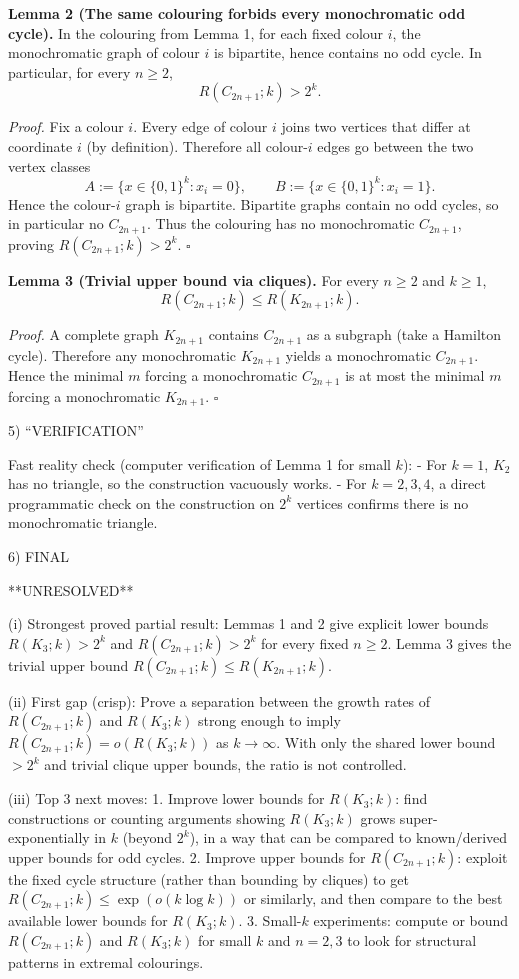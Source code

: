\textbf{Lemma 2 (The same colouring forbids every monochromatic odd cycle).}
In the colouring from Lemma 1, for each fixed colour $i$, the monochromatic graph of colour $i$ is bipartite, hence contains no odd cycle. In particular, for every $n\ge 2$,
\[
R(C_{2n+1};k) > 2^k.
\]

\emph{Proof.}
Fix a colour $i$. Every edge of colour $i$ joins two vertices that differ at coordinate $i$ (by definition). Therefore all colour-$i$ edges go between the two vertex classes
\[
A:=\{x\in\{0,1\}^k : x_i=0\},\qquad B:=\{x\in\{0,1\}^k : x_i=1\}.
\]
Hence the colour-$i$ graph is bipartite. Bipartite graphs contain no odd cycles, so in particular no $C_{2n+1}$.
Thus the colouring has no monochromatic $C_{2n+1}$, proving $R(C_{2n+1};k)>2^k$. $\square$

\textbf{Lemma 3 (Trivial upper bound via cliques).}
For every $n\ge 2$ and $k\ge 1$,
\[
R(C_{2n+1};k) \le R(K_{2n+1};k).
\]

\emph{Proof.}
A complete graph $K_{2n+1}$ contains $C_{2n+1}$ as a subgraph (take a Hamilton cycle). Therefore any monochromatic $K_{2n+1}$ yields a monochromatic $C_{2n+1}$. Hence the minimal $m$ forcing a monochromatic $C_{2n+1}$ is at most the minimal $m$ forcing a monochromatic $K_{2n+1}$. $\square$

5) “VERIFICATION”

Fast reality check (computer verification of Lemma 1 for small $k$):
- For $k=1$, $K_{2}$ has no triangle, so the construction vacuously works.
- For $k=2,3,4$, a direct programmatic check on the construction on $2^k$ vertices confirms there is no monochromatic triangle.

6) FINAL

**UNRESOLVED**

(i) Strongest proved partial result: Lemmas 1 and 2 give explicit lower bounds $R(K_3;k)>2^k$ and $R(C_{2n+1};k)>2^k$ for every fixed $n\ge 2$. Lemma 3 gives the trivial upper bound $R(C_{2n+1};k)\le R(K_{2n+1};k)$.

(ii) First gap (crisp): Prove a separation between the growth rates of $R(C_{2n+1};k)$ and $R(K_3;k)$ strong enough to imply $R(C_{2n+1};k)=o(R(K_3;k))$ as $k\to\infty$. With only the shared lower bound $>2^k$ and trivial clique upper bounds, the ratio is not controlled.

(iii) Top 3 next moves:
1. Improve lower bounds for $R(K_3;k)$: find constructions or counting arguments showing $R(K_3;k)$ grows super-exponentially in $k$ (beyond $2^k$), in a way that can be compared to known/derived upper bounds for odd cycles.
2. Improve upper bounds for $R(C_{2n+1};k)$: exploit the fixed cycle structure (rather than bounding by cliques) to get $R(C_{2n+1};k)\le \exp(o(k\log k))$ or similarly, and then compare to the best available lower bounds for $R(K_3;k)$.
3. Small-$k$ experiments: compute or bound $R(C_{2n+1};k)$ and $R(K_3;k)$ for small $k$ and $n=2,3$ to look for structural patterns in extremal colourings.

